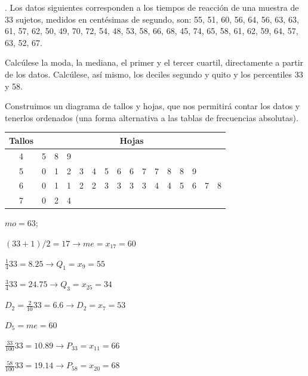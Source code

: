 \vspace{5mm}%
\begin{example}
	. Los datos siguientes corresponden a los tiempos de reacción de una muestra de $33$ sujetos, medidos en centésimas de segundo, son:
55, 51, 60, 56, 64, 56, 63, 63, 61, 57, 62, 50, 49, 70, 72, 54, 48, 53, 58, 66, 68, 45, 74, 65, 58, 61, 62, 59, 64, 57, 63, 52, 67.

\vspace{2mm} Calcúlese  la moda, la mediana, el primer y el tercer cuartil, directamente a partir de los datos.	Calcúlese, así mismo, los deciles segundo y quito y los percentiles 33 y 58.

\vspace{4mm}  Construimos un diagrama de tallos y hojas, que nos permitirá contar los datos y tenerlos ordenados (una forma alternativa a las tablas de frecuencias absolutas).

\begin{table}[H]
\centering
\begin{tabular}{c|ccccccccccccccc}
Tallos & \multicolumn{15}{c|}{Hojas} \\ \hline
4 & 5 & 8 & 9 &  &  &  &  &  &  &  &  &  &  &  &  \\
5 & 0 & 1 & 2 & 3 & 4 & 5 & 6 & 6 & 7 & 7 & 8 & 8 & 9 &  &  \\
6 & 0 & 1 & 1 & 2 & 2 & 3 & 3 & 3 & 3 & 4 & 4 & 5 & 6 & 7 & 8 \\
7 & 0 & 2 & 4 &  &  &  &  &  &  &  &  &  &  &  & 
\end{tabular}
\end{table}

\begin{multicols}{2}
$mo=63$; 

$ (33+1)/2 = 17 \to me=x_{17}=60$

$\frac 1 4 33= 8.25 \to Q_1=x_9=55$

$\frac 3 4 33=24.75 \to Q_3=x_{25}=34$

$D_2=\frac 2 {10} 33 = 6.6 \to D_2=x_{7}=53$

$D_5=me=60$

$\frac {33}{100}33=10.89 \to  P_{33}=x_{11}=66$

$\frac {58}{100}33=19.14 \to  P_{58}=x_{20}=68$
\end{multicols}

\end{example}


